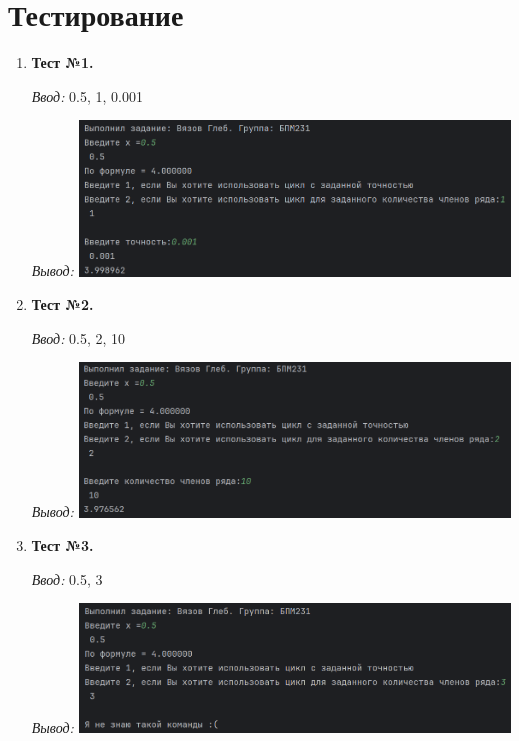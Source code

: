 \documentclass[12pt]{article}
\begin{document}
\newpage


\section*{Тестирование}

\begin{enumerate}

\item \textbf{Тест №1.} 

\textit{Ввод:} 0.5, 1, 0.001

\textit{Вывод:} \includegraphics[width=0.9\textwidth]{img2}



\item \textbf{Тест №2.}

\textit{Ввод:} 0.5, 2, 10

\textit{Вывод:} \includegraphics[width=0.9\textwidth]{img3}



\item \textbf{Тест №3.}

\textit{Ввод:} 0.5, 3

\textit{Вывод:} \includegraphics[width=0.9\textwidth]{img4}



\end{enumerate}
\end{document}
